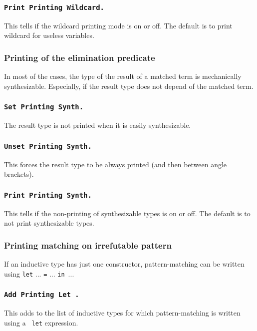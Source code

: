 {\begin{coq_example}
\subsubsection{\tt Print Printing Wildcard.}
This tells if the wildcard
printing mode is on or off. The default is to print wildcard for
useless variables.

\subsubsection{Printing of the elimination predicate}

In most of the cases, the type of the result of a matched term is
mechanically synthesizable. Especially, if the result type does not
depend of the matched term.

\subsubsection{\tt Set Printing Synth.}
The result type is not printed
when it is easily synthesizable.

\subsubsection{\tt Unset Printing Synth.}
This forces the result type to be always printed (and then between
angle brackets).

\subsubsection{\tt Print Printing Synth.}
This tells if the non-printing
of synthesizable types is on or off. The default is to not print 
synthesizable types.

\subsubsection{Printing matching on irrefutable pattern}

If an inductive type has just one constructor,
pattern-matching can be written using {\tt let} ... {\tt =}
... {\tt in}~...

\subsubsection{\tt Add Printing Let {\ident}.}
This adds {\ident} to the list
of inductive types for which pattern-matching is written using a {\tt
let} expression.


\end{coq_example}}
